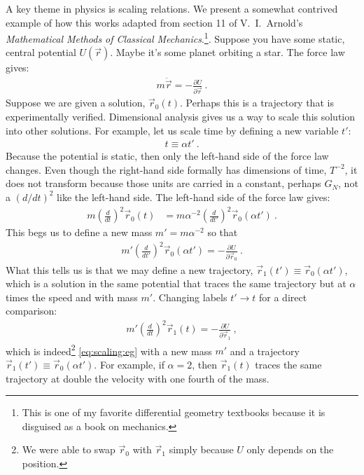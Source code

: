 \documentclass[
  11pt,
	colorful,
	raggedright,
]{tufte-style-thesis-flip}
\begin{document}
A key theme in physics is scaling relations. We present a somewhat contrived example of how this works adapted from section 11 of V.\ I.\ Arnold's \emph{Mathematical Methods of Classical Mechanics}.\footnote{This is one of my favorite differential geometry textbooks because it is disguised as a book on mechanics.}. Suppose you have some static, central potential $U(\vec r)$. Maybe it’s some planet orbiting a star. 
%
%
The force law gives:
\begin{align}
  m 
  \ddot{\vec{r}} = - \frac{\partial U}{\partial\vec{r}} \ .
  \label{eq:scaling:eg}
\end{align}
Suppose we are given a solution, $\vec r_0(t)$. Perhaps this is a trajectory that is experimentally verified. Dimensional analysis gives us a way to scale this solution into other solutions. For example, let us scale time by defining a new variable $t'$:
\begin{align}
  t \equiv \alpha t' \ .
\end{align}
Because the potential is static, then only the left-hand side of the force law changes. Even though the right-hand side formally has dimensions of time, $T^{-2}$, it does not transform because those units are carried in a constant, perhaps $G_N$, not a $(d/dt)^2$ like the left-hand side. The left-hand side of the force law gives:
\begin{align}
  m\left(\frac{d}{dt}\right)^2 \vec r_0(t) 
  &=
  m\alpha^{-2} \left(\frac{d}{dt'}\right)^2 \vec r_0(\alpha t') \ .
\end{align}
This begs us to define a new mass $m' = m\alpha^{-2}$ so that
\begin{align}
   m' \left(\frac{d}{dt'}\right)^2 {\vec{r}_0}(\alpha t')
  = - \frac{\partial U}{\partial\vec{r}_0} \ .
\end{align}
What this tells us is that we may define a new trajectory, $\vec r_1(t') \equiv \vec{r}_0(\alpha t')$, which is a solution in the same potential that traces the same trajectory but at $\alpha$ times the speed and with mass $m'$. Changing labels $t'\to t$ for a direct comparison:
\begin{align}
   m' \left(\frac{d}{dt}\right)^2 {\vec{r}_1}(t)
  = - \frac{\partial U}{\partial\vec{r}_1} \ ,
\end{align}
which is indeed\footnote{We were able to swap $\vec r_0$ with $\vec r_1$ simply because $U$ only depends on the position.} \eqref{eq:scaling:eg} with a new mass $m'$ and a trajectory $\vec r_1(t') \equiv \vec{r}_0(\alpha t')$. For example, if $\alpha = 2$, then $\vec r_1(t)$ traces the same trajectory at double the velocity with one fourth of the mass.
\end{document}
